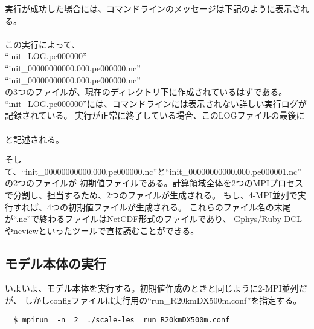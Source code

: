 \noindent 実行が成功した場合には、コマンドラインのメッセージは下記のように表示される。\\
{\small {\gt
{}}}\\

\noindent この実行によって、\\
``init\_LOG.pe000000''\\
``init\_00000000000.000.pe000000.nc''\\
``init\_00000000000.000.pe000000.nc''\\
の3つのファイルが、現在のディレクトリ下に作成されているはずである。
``init\_LOG.pe000000''には、コマンドラインには表示されない詳しい実行ログが記録されている。
実行が正常に終了している場合、このLOGファイルの最後に\\

{\small {\gt
{}}}\\
\noindent と記述される。

そして、``init\_00000000000.000.pe000000.nc''と``init\_00000000000.000.pe000001.nc''の2つのファイルが
初期値ファイルである。計算領域全体を2つのMPIプロセスで分割し、担当するため、2つのファイルが生成される。
もし、4-MPI並列で実行すれば、4つの初期値ファイルが生成される。
これらのファイル名の末尾が``.nc''で終わるファイルはNetCDF形式のファイルであり、
Gphys/Ruby-DCLやncviewといったツールで直接読むことができる。


\subsection{モデル本体の実行}
いよいよ、モデル本体を実行する。初期値作成のときと同じように2-MPI並列だが、
しかしconfigファイルは実行用の``run\_R20kmDX500m.conf''を指定する。
\begin{verbatim}
  $ mpirun  -n  2  ./scale-les  run_R20kmDX500m.conf
\end{verbatim}

